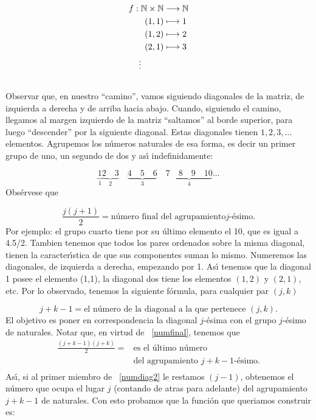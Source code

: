 \begin{demo}
\begin{eqnarray}
    f:\nn\times\nn&\longrightarrow\nn\nonumber \\
    (1,1)&\longmapsto 1\nonumber \\
    (1,2)&\longmapsto 2\nonumber \\
     (2,1)&\longmapsto 3\nonumber\\
        &\hspace{-29pt}\vdots\nonumber \\
        \nonumber
\end{eqnarray}
Observar que, en nuestro ``camino'', vamos siguiendo diagonales de
la matriz, de izquierda a derecha y de arriba hacia abajo. Cuando,
siguiendo el camino, llegamos al margen izquierdo de la matriz
``saltamos'' al borde superior, para luego ``descender'' por la
siguiente diagonal. Estas diagonales tienen $1, 2, 3, \dots$
elementos. Agrupemos los n\'umeros naturales de esa forma, es
decir un primer grupo de uno, un segundo de dos y as\'{\i}
indefinidamente:

\[\underbrace{1}_{1} \underbrace{2\quad 3}_{2}\quad\underbrace{4\quad 5\quad
6}_{3}\quad \underbrace{7\quad 8\quad  9\quad 10}_{4}\dots
\]
Obs\'ervese que

\begin{equation}\label{numfinal}
\frac{j(j +1)}{2}=\text{n\'umero final del agrupamiento
$j$-\'esimo}.
\end{equation}
Por ejemplo: el grupo cuarto tiene por su \'ultimo elemento el 10,
que es igual a 4.5/2. Tambien tenemos que todos los pares
ordenados sobre la misma diagonal, tienen la caracter\'{\i}stica
de que sus componentes suman lo mismo. Numeremos las diagonales,
de izquierda a derecha, empezando por 1. As\'{\i} tenemos que la
diagonal 1 posee el elemento (1,1), la diagonal dos tiene los
elementos $(1,2)$ y $(2,1)$, etc. Por lo observado, tenemos la
siguiente f\'ormula, para cualquier par $(j,k)$

\begin{equation}\label{numdiag}
j+k-1=\text{el n\'umero de la diagonal a la que pertenece } (j,k).
\end{equation}
 El objetivo es poner en correspondencia la diagonal
$j$-\'esima con el grupo $j$-\'esimo de naturales. Notar que, en
virtud de ~\eqref{numfinal}, tenemos que
\begin{equation}\label{numdiag2}
\begin{split}\frac{(j+k-1)(j+k)}{2}=&\text{es el \'ultimo n\'umero}\\
 & \text{del agrupamiento $j+k-1$-\'esimo}.\\
\end{split}
\end{equation}
As\'{\i}, si al primer miembro de ~\eqref{numdiag2} le restamos
$(j-1)$, obtenemos el n\'umero que ocupa el lugar $j$ (contando de
atras para adelante) del agrupamiento $j+k-1$ de naturales. Con
esto probamos que la funci\'on que queriamos construir es:



\end{demo}
